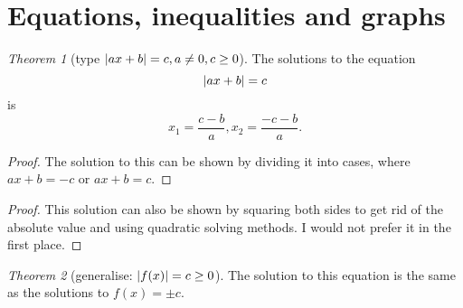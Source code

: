 \documentclass[8pt]{article}
\theoremstyle{remark}
\newtheorem{theorem}{Theorem}[section]
\begin{document}
    \section{Equations, inequalities and graphs}
        \begin{theorem}[type $\left\lvert ax + b \right\rvert = c, a \neq 0, c \geq 0$]
            The solutions to the equation
            $$
                \left\lvert ax + b \right\rvert = c
            $$
            is
            $$
                x_1 = \frac{c - b}{a}, x_2 = \frac{-c -b}{a}.
            $$

            \begin{proof}
                The solution to this can be shown by dividing it into cases, where $ax + b = -c$ or $ax + b = c$.
            \end{proof}

            \begin{proof}
                This solution can also be shown by squaring both sides to get rid of the absolute value and using quadratic solving methods. I would not prefer it in the first place.
            \end{proof}
        \end{theorem}

        \begin{theorem}[generalise: $\left\lvert f(x) \right\rvert = c \geq 0$]
            The solution to this equation is the same as the solutions to $f(x) = \pm c$.
        \end{theorem}
\end{document}
